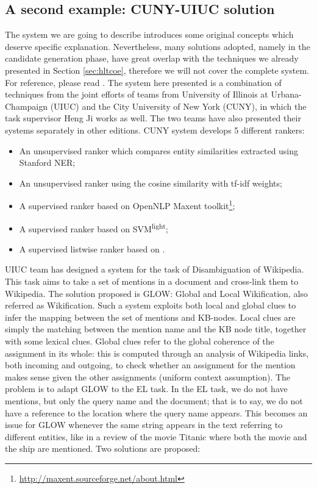\documentclass[a4paper,11pt]{report}
\begin{document}
\subsection{A second example: CUNY-UIUC solution}
\label{sec:uiuc}
The system we are going to describe introduces some original concepts which deserve specific explanation. Nevertheless, many solutions adopted, namely in the candidate generation phase, have great overlap with the techniques we already presented in Section \ref{sec:hltcoe}, therefore we will not cover the complete system. For reference, please read \cite{2011cuny, chen2010cuny, 2012cuny}.
The system here presented is a combination of techniques from the joint efforts of teams from University of Illinois at Urbana-Champaign (UIUC) and the City University of New York (CUNY), in which the task supervisor Heng Ji works as well. The two teams have also presented their systems separately in other editions.
CUNY system develops 5 different rankers:
\begin{itemize}
\item An unsupervised ranker which compares entity similarities extracted using Stanford NER;
\item An unsupervised ranker using the cosine similarity with tf-idf weights;
\item A supervised ranker based on OpenNLP Maxent toolkit\footnote{\url{http://maxent.sourceforge.net/about.html}}; 
\item A supervised ranker based on SVM\textsuperscript{light};
\item A supervised listwise ranker based on \citet{cao2007}.
\end{itemize}
UIUC team has designed a system for the task of Disambiguation of Wikipedia. This task aims to take a set of mentions in a document and cross-link them to Wikipedia. The solution proposed is GLOW: Global and Local Wikification, also referred as Wikification. Such a system exploits both local and global clues to infer the mapping between the set of mentions and KB-nodes. Local clues are simply the matching between the mention name and the KB node title, together with some lexical clues. Global clues refer to the global coherence of the assignment in its whole: this is computed through an analysis of Wikipedia links, both incoming and outgoing, to check whether an assignment for the mention makes sense given the other assignments (uniform context assumption).
The problem is to adapt GLOW to the EL task. In the EL task, we do not have mentions, but only the query name and the document; that is to say, we do not have a reference to the location where the query name appears. This becomes an issue for GLOW whenever the same string appears in the text referring to different entities, like in a review of the movie Titanic where both the movie and the ship are mentioned. Two solutions are proposed:
\end{document}
